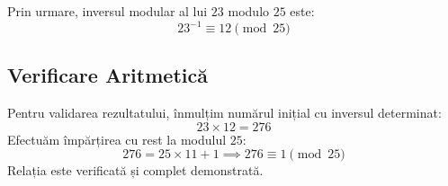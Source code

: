 \documentclass[12pt]{article}
\begin{document}
Prin urmare, inversul modular al lui $23$ modulo $25$ este:
\[
23^{-1} \equiv 12 \pmod{25}
\]

\subsection*{Verificare Aritmetică}
Pentru validarea rezultatului, înmulțim numărul inițial cu inversul determinat:
\[
23 \times 12 = 276
\]
Efectuăm împărțirea cu rest la modulul $25$:
\[
276 = 25 \times 11 + 1 \implies 276 \equiv 1 \pmod{25}
\]
Relația este verificată și complet demonstrată.
\end{document}
